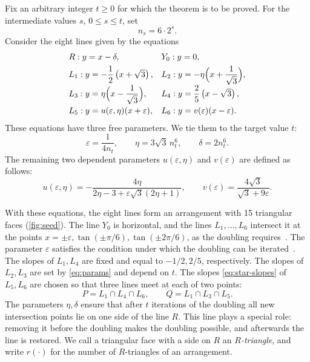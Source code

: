 Fix an arbitrary integer $t\ge0$ for which the theorem is to be proved. For the intermediate values $s$, $0\le s\le t$, set
\[
n_s=6\cdot2^s.
\]
Consider the eight lines given by the equations
\begin{equation}\label{eq:base-lines}
\begin{array}{ll}
R:y=x-\delta,
&Y_0:y=0,\\[4pt]
L_1:y=-\dfrac12\left(x+\sqrt3\right),
&L_2:y=-\eta\Bigl(x+\dfrac1{\sqrt3}\Bigr),\\[6pt]
L_3:y=\eta\Bigl(x-\dfrac1{\sqrt3}\Bigr),
&L_4:y=\dfrac25\left(x-\sqrt3\right),\\[8pt]
L_5:y=u(\varepsilon,\eta)(x+\varepsilon),
&L_6:y=v(\varepsilon)(x-\varepsilon).
\end{array}
\end{equation}
These equations have three free parameters. We tie them to the target value $t$:
\begin{equation}\label{eq:params}
\varepsilon=\frac1{4n_t},
\qquad
\eta=3\sqrt3\,n_t^6,
\qquad
\delta=2n_t^6.
\end{equation}
The remaining two dependent parameters $u(\varepsilon,\eta)$ and $v(\varepsilon)$ are defined as follows:
\begin{equation}\label{eq:star-slopes}
u(\varepsilon,\eta)=-\frac{4\eta}{2\eta-3+\varepsilon\sqrt3(2\eta+1)},
\qquad
v(\varepsilon)=\frac{4\sqrt3}{\sqrt3+9\varepsilon}.
\end{equation}

With these equations, the eight lines form an arrangement with 15 triangular faces (\cref{fig:seed}).
The line $Y_0$ is horizontal, and the lines $L_1,\ldots,L_6$ intersect it at the points $x=\pm\varepsilon,\tan(\pm\pi/6),\tan(\pm2\pi/6)$,
as the doubling requires~\cite[Prop.~3.1]{bbl}. The parameter $\varepsilon$ satisfies the condition under which the doubling can be iterated~\cite[Remark~3.2]{bbl}.
The slopes of $L_1,L_4$ are fixed and equal to $-1/2, 2/5$, respectively. The slopes of $L_2,L_3$ are set by \eqref{eq:params} and depend on $t$.
The slopes \eqref{eq:star-slopes} of $L_5,L_6$ are chosen so that three lines meet at each of two points:
\[
P=L_1\cap L_4\cap L_6,
\qquad
Q=L_1\cap L_3\cap L_5.
\]
The parameters $\eta,\delta$ ensure that after $t$ iterations of the doubling all new intersection points lie on one side of the line $R$.
This line plays a special role:
removing it before the doubling makes the doubling possible, and afterwards the line is restored.
We call a triangular face with a side on $R$ an \emph{$R$-triangle}, and write $r(\cdot)$ for the number of $R$-triangles of an arrangement.

